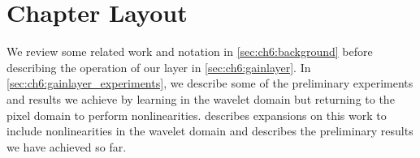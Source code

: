 \section{Chapter Layout}
We review some related work and notation in \autoref{sec:ch6:background} before
describing the operation of our layer in \autoref{sec:ch6:gainlayer}.
In \autoref{sec:ch6:gainlayer_experiments}, we describe some of the preliminary
experiments and results we achieve by learning in the wavelet domain but
returning to the pixel domain to perform nonlinearities. 
describes expansions on this work to include nonlinearities in the wavelet
domain and describes the preliminary results we have achieved so far.
